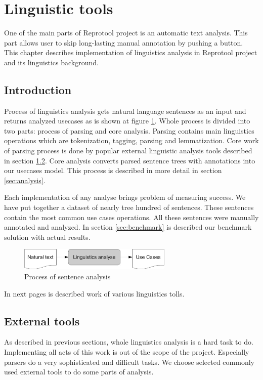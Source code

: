 \section{Linguistic tools}

One of the main parts of Reprotool project is an automatic text analysis. This part allows user to skip long-lasting manual annotation by pushing a button. This chapter describes implementation of linguistics analysis in Reprotool project and its linguistics background.

\subsection{Introduction}
Process of linguistics analysis gets natural language sentences as an input and returns analyzed usecases as is shown at figure \ref{fig:LinguisticsAnalyseSmall}. Whole process is divided into two parts: process of parsing and core analysis. Parsing contains main linguistics operations which are tokenization, tagging, parsing and lemmatization. Core work of parsing process is done by popular external linguistic analysis tools described in section \ref{sec:externaltools}. Core analysis converts parsed sentence trees with annotations into our usecases model. This process is described in more detail in section \ref{sec:analysis}. %

Each implementation of any analyse brings problem of measuring success. We have put together a dataset of nearly tree hundred of sentences. These sentences contain the most common use cases operations. All these sentences were manually annotated and analyzed. In section \ref{sec:benchmark} is described our benchmark solution with actual results.

\begin{figure}[ht]
  \centering
  \includegraphics[height=30pt]{images/LinguisticsAnalyseSmall}
  \caption{Process of sentence analysis}
  \label{fig:LinguisticsAnalyseSmall}
\end{figure}

In next pages is described work of various linguistics tolls.

\subsection{External tools}
\label{sec:externaltools}
As described in previous sections, whole linguistics analysis is a hard task to do. Implementing all acts of this work is out of the scope of the project.  Especially parsers do a very sophisticated and difficult tasks. We choose selected commonly used external tools to do some parts of analysis. 

